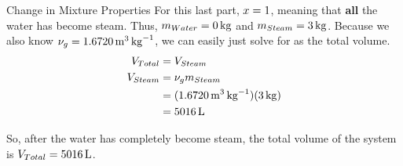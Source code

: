 \begin{example}{Change in Mixture Properties}
  For this last part, $x = 1$, meaning that \textbf{all} the water has become steam.
  Thus, $m_{Water} = \SI{0}{\kilo\gram}$ and $m_{Steam} = \SI{3}{\kilo\gram}$.
  Because we also know $\nu_{g} = \SI{1.6720}{\meter\cubed\per\kilo\gram}$, we can easily just solve for  as the total volume.
  \begin{align*}
    V_{Total} &= V_{Steam} \\
    V_{Steam} &= \nu_{g} m_{Steam} \\
                    &= (\SI{1.6720}{\meter\cubed\per\kilo\gram}) (\SI{3}{\kilo\gram}) \\
                    &= \SI{5016}{\liter}
  \end{align*}

  So, after the water has completely become steam, the total volume of the system is $V_{Total} = \SI{5016}{\liter}$.
\end{example}

